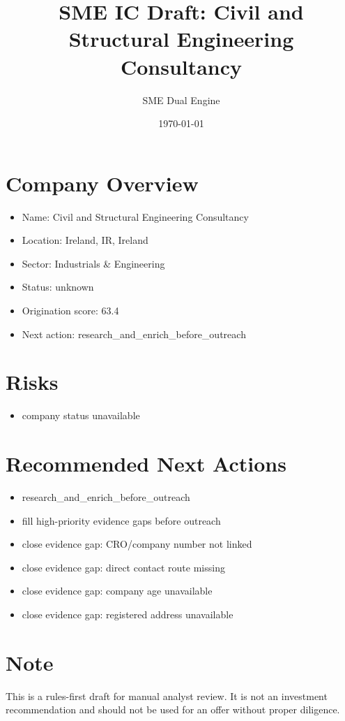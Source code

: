 \documentclass[11pt,a4paper]{article}
\title{SME IC Draft: Civil and Structural Engineering Consultancy}
\author{SME Dual Engine}
\date{\today}
\begin{document}
\maketitle
\section*{Company Overview}
\begin{itemize}[leftmargin=1.4em]
\item Name: Civil and Structural Engineering Consultancy
\item Location: Ireland, IR, Ireland
\item Sector: Industrials \& Engineering
\item Status: unknown
\item Origination score: 63.4
\item Next action: research\_and\_enrich\_before\_outreach
\end{itemize}
\section*{Risks}
\begin{itemize}[leftmargin=1.4em]
\item company status unavailable
\end{itemize}
\section*{Recommended Next Actions}
\begin{itemize}[leftmargin=1.4em]
\item research\_and\_enrich\_before\_outreach
\item fill high-priority evidence gaps before outreach
\item close evidence gap: CRO/company number not linked
\item close evidence gap: direct contact route missing
\item close evidence gap: company age unavailable
\item close evidence gap: registered address unavailable
\end{itemize}
\section*{Note}
This is a rules-first draft for manual analyst review. It is not an investment
recommendation and should not be used for an offer without proper diligence.
\end{document}
